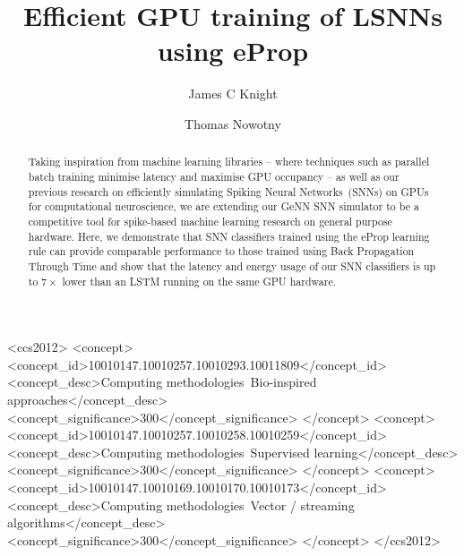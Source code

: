 \documentclass[sigconf,authordraft]{acmart}
\begin{document}
\title{Efficient GPU training of LSNNs using eProp}

\author{James C Knight}

\author{Thomas Nowotny}
\renewcommand{\shortauthors}{Knight and Nowotny}

\begin{abstract}
    Taking inspiration from machine learning libraries -- where techniques such as parallel batch training minimise latency and maximise GPU occupancy -- as well as our previous research on efficiently simulating Spiking Neural Networks~(SNNs) on GPUs for computational neuroscience, we are extending our GeNN SNN simulator to be a competitive tool for spike-based machine learning research on general purpose hardware.
    Here, we demonstrate that SNN classifiers trained using the eProp learning rule can provide comparable performance to those trained using Back Propagation Through Time and show that the latency and energy usage of our SNN classifiers is up to $7\times$ lower than an LSTM running on the same GPU hardware.
\end{abstract}

\begin{CCSXML}
<ccs2012>
   <concept>
       <concept_id>10010147.10010257.10010293.10011809</concept_id>
       <concept_desc>Computing methodologies~Bio-inspired approaches</concept_desc>
       <concept_significance>300</concept_significance>
       </concept>
   <concept>
       <concept_id>10010147.10010257.10010258.10010259</concept_id>
       <concept_desc>Computing methodologies~Supervised learning</concept_desc>
       <concept_significance>300</concept_significance>
       </concept>
   <concept>
       <concept_id>10010147.10010169.10010170.10010173</concept_id>
       <concept_desc>Computing methodologies~Vector / streaming algorithms</concept_desc>
       <concept_significance>300</concept_significance>
       </concept>
 </ccs2012>
\end{CCSXML}
\end{document}
